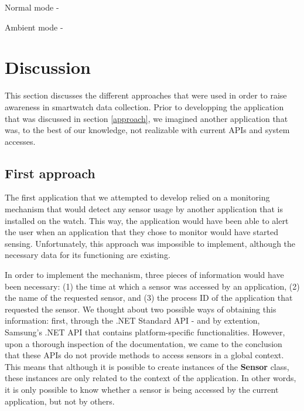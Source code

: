 \documentclass[conference, a4paper, 10pt, twocolumn]{IEEEtran}
\begin{document}
Normal mode - 

Ambient mode - 


\section{Discussion}\label{discussion}
This section discusses the different approaches that were used in order to raise awareness in smartwatch data collection. Prior to developping the application that was discussed in section \ref{approach}, we imagined another application that was, to the best of our knowledge, not realizable with current \acp{API} and system accesses.  

\subsection{First approach}
The first application that we attempted to develop relied on a monitoring mechanism that would detect any sensor usage by another application that is installed on the watch. This way, the application would have been able to alert the user when an application that they chose to monitor would have started sensing. Unfortunately, this approach was impossible to implement, although the necessary data for its functioning are existing.

In order to implement the mechanism, three pieces of information would have been necessary: (1) the time at which a sensor was accessed by an application, (2) the name of the requested sensor, and (3) the process ID of the application that requested the sensor. We thought about two possible ways of obtaining this information: first, through the .NET Standard \ac{API} - and by extention, Samsung's .NET \ac{API} that contains platform-specific functionalities\cite{tizen}. However, upon a thorough inspection of the documentation, we came to the conclusion that these \acp{API} do not provide methods to access sensors in a global context. This means that although it is possible to create instances of the \textbf{Sensor} class, these instances are only related to the context of the application. In other words, it is only possible to know whether a sensor is being accessed by the current application, but not by others. 
\end{document}
